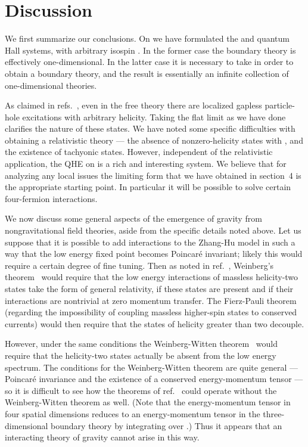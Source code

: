 \documentclass[a4paper,12pt]{article}
\providecommand{\R}{R}
\begin{document}
\section{Discussion}

We first summarize our conclusions.  On \myHighlight{$\R^4$}\coordHE{} we have formulated the \coordHE{}
and \coordHE{} quantum Hall systems, with arbitrary \coordHE{} isospin \coordHE{}.  In
the former case the boundary theory is effectively one-dimensional.  In the
latter case it is necessary to take \coordHE{} in order to obtain a
boundary theory, and the result is essentially an infinite collection of
one-dimensional theories.

As claimed in refs.~\cite{hz1,hz2}, even in the free theory there are
localized gapless particle-hole excitations with arbitrary helicity.  Taking
the flat limit as we have done clarifies the nature of these states.  We have
noted some specific difficulties with obtaining a relativistic theory --- the
absence of nonzero-helicity states with \coordHE{}, and the existence of tachyonic states.  However, independent
of the relativistic application, the QHE on
\myHighlight{$\R^4$}\coordHE{} is a rich and interesting system.  We believe that for analyzing
any local issues the limiting form that we have obtained in section~4 is the
appropriate starting point.  In particular it will be possible to solve 
certain four-fermion interactions.

We now discuss some general aspects of the emergence of gravity from
nongravitational field theories, aside from the specific details noted above. 
Let us suppose that it is possible to add interactions to the Zhang-Hu model in
such a way that the low energy fixed point becomes Poincar\'e invariant;
likely this would require a certain degree of fine tuning.  Then as noted in
ref.~\cite{hz1}, Weinberg's theorem~\cite{weinberg} would require that the low
energy interactions of massless helicity-two states take
the form of general relativity,
if these states are present and if their interactions are nontrivial  at zero
momentum transfer. The Fierz-Pauli theorem~\cite{paulifierz} (regarding the
impossibility of coupling massless higher-spin states to conserved currents)
would then require that the states of helicity greater than two decouple.

However, under the same conditions the Weinberg-Witten theorem~\cite{weinwit}
would require that the helicity-two states actually be absent from the low
energy spectrum.  The conditions for the Weinberg-Witten theorem are quite
general --- Poincar\'e invariance and the existence of a conserved
energy-momentum tensor --- so it is difficult to see how the theorems of
ref.~\cite{weinberg} could operate without the Weinberg-Witten theorem as
well.  (Note that the energy-momentum tensor in four spatial dimensions
reduces to an energy-momentum tensor in the three-dimensional boundary theory
by integrating over \coordHE{}.)  Thus it appears that an interacting theory of
gravity cannot arise in this way.
\end{document}
